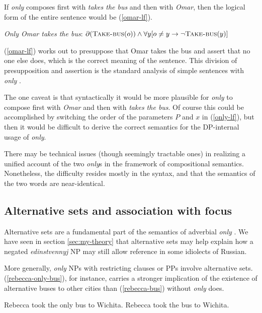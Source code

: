 If \textit{only} composes first with \textit{takes the bus} and then with \textit{Omar}, then the logical form of the entire sentence would be (\ref{omar-lf}).

\begin{exe}
	\ex \label{omar-lf} \textit{Only Omar takes the bus}: $\partial(\textsc{Take-bus}(o)) \land \forall y [ o \ne y \to \neg \textsc{Take-bus}(y) ]$
\end{exe}

(\ref{omar-lf}) works out to presuppose that Omar takes the bus and assert that no one else does, which is the correct meaning of the sentence. This division of presupposition and assertion is the standard analysis of simple sentences with \textit{only} \citep{horn69}.

The one caveat is that syntactically it would be more plausible for \textit{only} to compose first with \textit{Omar} and then with \textit{takes the bus}. Of course this could be accomplished by switching the order of the parameters $P$ and $x$ in (\ref{only-lf}), but then it would be difficult to derive the correct semantics for the DP-internal usage of \textit{only}.

There may be technical issues (though seemingly tractable ones) in realizing a unified account of the two \textit{only}s in the framework of compositional semantics. Nonetheless, the difficulty resides mostly in the syntax, and that the semantics of the two words are near-identical.


\subsection{Alternative sets and association with focus}
Alternative sets are a fundamental part of the semantics of adverbial \textit{only} \citep{rooth85, rooth92}. We have seen in section \ref{sec:my-theory} that alternative sets may help explain how a negated \textit{edinstvennyj} NP may still allow reference in some idiolects of Russian.

More generally, \textit{only} NPs with restricting clauses or PPs involve alternative sets. (\ref{rebecca-only-bus}), for instance, carries a stronger implication of the existence of alternative buses to other cities than (\ref{rebecca-bus}) without \textit{only} does.

\begin{exe}
	\ex \label{rebecca-only-bus} Rebecca took the only bus to Wichita.
	\ex \label{rebecca-bus} Rebecca took the bus to Wichita.
\end{exe}

